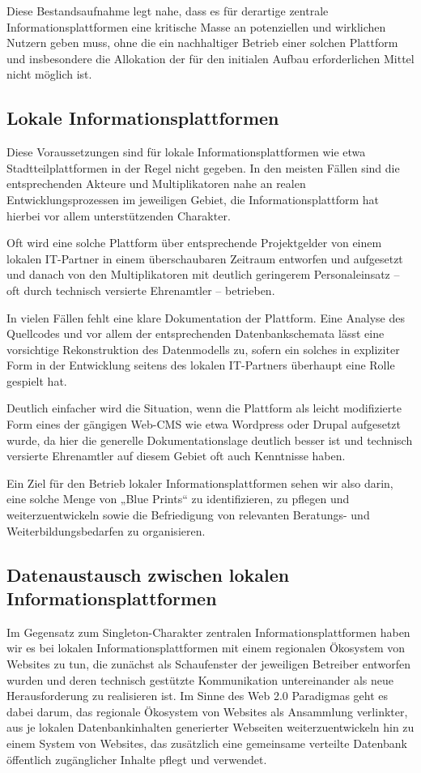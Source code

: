 \documentclass[a4paper,11pt]{article}
\begin{document}
Diese Bestandsaufnahme legt nahe, dass es für derartige zentrale
Informationsplattformen eine kritische Masse an potenziellen und wirklichen
Nutzern geben muss, ohne die ein nachhaltiger Betrieb einer solchen Plattform
und insbesondere die Allokation der für den initialen Aufbau erforderlichen
Mittel nicht möglich ist.

\subsection{Lokale Informationsplattformen} 

Diese Voraussetzungen sind für lokale Informationsplattformen wie etwa
Stadtteilplattformen in der Regel nicht gegeben. In den meisten Fällen sind die
entsprechenden Akteure und Multiplikatoren nahe an realen Entwicklungsprozessen
im jeweiligen Gebiet, die Informationsplattform hat hierbei vor allem
unterstützenden Charakter.  

Oft wird eine solche Plattform über entsprechende Projektgelder von einem
lokalen IT-Partner in einem überschaubaren Zeitraum entworfen und aufgesetzt
und danach von den Multiplikatoren mit deutlich geringerem Personaleinsatz --
oft durch technisch versierte Ehrenamtler -- betrieben.

In vielen Fällen fehlt eine klare Dokumentation der Plattform.  Eine Analyse
des Quellcodes und vor allem der entsprechenden Datenbankschemata lässt eine
vorsichtige Rekonstruktion des Datenmodells zu, sofern ein solches in
expliziter Form in der Entwicklung seitens des lokalen IT-Partners überhaupt
eine Rolle gespielt hat. 

Deutlich einfacher wird die Situation, wenn die Plattform als leicht
modifizierte Form eines der gängigen Web-CMS wie etwa Wordpress oder Drupal
aufgesetzt wurde, da hier die generelle Dokumentationslage deutlich besser ist
und technisch versierte Ehrenamtler auf diesem Gebiet oft auch Kenntnisse
haben.  

Ein Ziel für den Betrieb lokaler Informationsplattformen sehen wir also darin,
eine solche Menge von „Blue Prints“ zu identifizieren, zu pflegen und
weiterzuentwickeln sowie die Befriedigung von relevanten Beratungs- und
Weiterbildungsbedarfen zu organisieren. 

\subsection{Datenaustausch zwischen lokalen Informationsplattformen} 

Im Gegensatz zum Singleton-Charakter zentralen Informationsplattformen haben
wir es bei lokalen Informationsplattformen mit einem regionalen Ökosystem von
Websites zu tun, die zunächst als Schaufenster der jeweiligen Betreiber
entworfen wurden und deren technisch gestützte Kommunikation untereinander als
neue Herausforderung zu realisieren ist.  Im Sinne des Web 2.0 Paradigmas geht
es dabei darum, das regionale Ökosystem von Websites als Ansammlung verlinkter,
aus je lokalen Datenbankinhalten generierter Webseiten weiterzuentwickeln hin
zu einem System von Websites, das zusätzlich eine gemeinsame verteilte
Datenbank öffentlich zugänglicher Inhalte pflegt und verwendet. 
\end{document}
